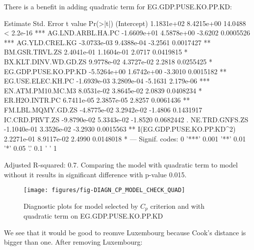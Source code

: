 \documentclass[a4paper]{article}
\begin{document}
There is a benefit in adding quadratic term for EG.GDP.PUSE.KO.PP.KD:
\begin{Schunk}
\begin{Soutput}
                             Estimate  Std. Error t value  Pr(>|t|)    
(Intercept)                1.1831e+02  8.4215e+00 14.0488 < 2.2e-16 ***
AG.LND.ARBL.HA.PC         -1.6609e+01  4.5878e+00 -3.6202 0.0005526 ***
AG.YLD.CREL.KG            -3.0733e-03  9.4388e-04 -3.2561 0.0017427 ** 
BM.GSR.TRVL.ZS             2.4041e-01  1.1604e-01  2.0717 0.0419815 *  
BX.KLT.DINV.WD.GD.ZS       9.9778e-02  4.3727e-02  2.2818 0.0255425 *  
EG.GDP.PUSE.KO.PP.KD      -5.5264e+00  1.6742e+00 -3.3010 0.0015182 ** 
EG.USE.ELEC.KH.PC         -1.6939e-03  3.2809e-04 -5.1631 2.179e-06 ***
EN.ATM.PM10.MC.M3          8.0531e-02  3.8645e-02  2.0839 0.0408234 *  
ER.H2O.INTR.PC             6.7411e-05  2.3857e-05  2.8257 0.0061436 ** 
FM.LBL.MQMY.GD.ZS         -4.8775e-02  3.2942e-02 -1.4806 0.1431917    
IC.CRD.PRVT.ZS            -9.8790e-02  5.3343e-02 -1.8520 0.0682442 .  
NE.TRD.GNFS.ZS            -1.1040e-01  3.3526e-02 -3.2930 0.0015563 ** 
I(EG.GDP.PUSE.KO.PP.KD^2)  2.2271e-01  8.9117e-02  2.4990 0.0148018 *  
---
Signif. codes:  0 '***' 0.001 '**' 0.01 '*' 0.05 '.' 0.1 ' ' 1
\end{Soutput}
\end{Schunk}
Adjusted R-squared:
0.7. Comparing the
model with quadratic term to model without it results in significant difference
with p-value 0.015.

\begin{figure}[H]
\begin{center}
\texttt{[image: figures/fig-DIAGN\_CP\_MODEL\_CHECK\_QUAD]}
\caption{Diagnostic plots for model selected by $C_p$ criterion
and with quadratic term on EG.GDP.PUSE.KO.PP.KD}
\end{center}
\end{figure}

We see that it would be good to reomve Luxembourg because Cook's distance is bigger
than one. After removing Luxembourg:
		
\end{document}
